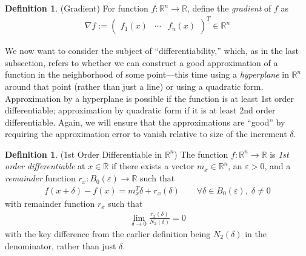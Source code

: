 \documentclass[12pt]{book}
\numberwithin{equation}{section} %
\theoremstyle{plain}
\theoremstyle{definition}
\newtheorem{defn}[thm]{Definition}
\theoremstyle{remark}
\newcommand{\R}{\mathbb{R}}
\newcommand{\Rn}{\mathbb{R}^n}
\begin{document}
\begin{defn}{(Gradient)}
For function $f:\Rn\rightarrow\R$, define the \emph{gradient} of $f$ as
\begin{align*}
  \nabla f :=
  \begin{pmatrix}
    f_1(x) & \cdots & f_n(x)
  \end{pmatrix}^T \in \Rn
\end{align*}
\end{defn}

We now want to consider the subject of ``differentiability,'' which, as
in the last subsection, refers to whether we can construct a good
approximation of a function in the neighborhood of some point---this
time using a \emph{hyperplane} in $\Rn$ around that point (rather than
just a line) or using a quadratic form.  Approximation by a hyperplane
is possible if the function is at least 1st order differentiable;
approximation by quadratic form if it is at least 2nd order
differentiable.  Again, we will ensure that the approximations are
``good'' by requiring the approximation error to vanish relative to size
of the increment $\delta$.

\begin{defn}{(1st Order Differentiable in $\Rn$)}
\label{defn:diffableRn}
The function $f:\Rn\rightarrow\R$ is \emph{1st order differentiable} at
$x\in\R$ if there exists a vector $m_x\in\Rn$, an $\varepsilon>0$, and a
\emph{remainder} function $r_x:B_0(\varepsilon)\rightarrow\R$ such that
\begin{align}
  \label{eq:diffapproxRn}
  f(x+\delta)-f(x) = m_x^T \delta + r_x(\delta)
  \qquad \forall \delta\in B_0(\varepsilon), \; \delta \neq 0
\end{align}
with remainder function $r_x$ such that
\begin{align}
  \label{lim:remainderRn}
  \lim_{\delta\rightarrow 0}
  \frac{r_x(\delta)}{N_2(\delta)}=0
\end{align}
with the key difference from the earlier definition being $N_2(\delta)$
in the denominator, rather than just $\delta$.
\end{defn}
\end{document}
